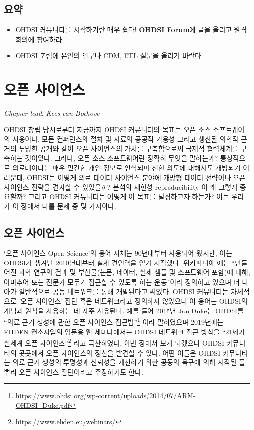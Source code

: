 \documentclass[10.5pt]{book}
\let\rmarkdownfootnote\footnote%
\def\footnote{\protect\rmarkdownfootnote}
\theoremstyle{definition}
\theoremstyle{definition}
\theoremstyle{definition}
\theoremstyle{remark}
\let\BeginKnitrBlock\begin \let\EndKnitrBlock\end
\begin{document}
\section{요약}\label{-1}

\BeginKnitrBlock{rmdsummary}
\begin{itemize}
\item
  OHDSI 커뮤니티를 시작하기란 매우 쉽다! \textbf{OHDSI Forum}에 글을
  올리고 원격 회의에 참여하라.
\item
  OHDSI 포럼에 본인의 연구나 CDM, ETL 질문을 올리기 바란다.
\end{itemize}
\EndKnitrBlock{rmdsummary}

\chapter{오픈 사이언스}\label{OpenScience}


\emph{Chapter lead: Kees van Bochove}

OHDSI 창립 당시로부터 지금까지 OHDSI 커뮤니티의 목표는 오픈 소스
소프트웨어의 사용이나, 모든 컨퍼런스의 절차 및 자료의 공공적 가용성
그리고 생산된 의학적 근거의 투명한 공개와 같이 오픈 사이언스의 가치를
구축함으로써 국제적 협력체계를 구축하는 것이었다. 그러나, 오픈 소스
소프트웨어란 정확히 무엇을 말하는가? 통상적으로 의료데이터는 매우 민간한
개인 정보로 인식되며 선한 의도에 대해서도 개방되기 어려운데, OHDSI는
어떻게 의료 데이터 사이언스 분야에 개방형 데이터 전략이나 오픈 사이언스
전략을 견지할 수 있었을까? 분석의 재현성 reproducibility 이 왜 그렇게
중요할까? 그리고 OHDSI 커뮤니티는 어떻게 이 목표를 달성하고자 하는가?
이는 우리가 이 장에서 다룰 문제 중 몇 가지이다.

\section{오픈 사이언스}\label{-}

`오픈 사이언스 Open Science'의 용어 자체는 90년대부터 사용되어 왔지만,
이는 OHDSI가 생겨난 2010년대부터 실제 견인력을 얻기 시작했다. 위키피디아
\citep{wiki:Open_science} 에는 ``만들어진 과학 연구의 결과 및
부산물(논문, 데이터, 실제 샘플 및 소프트웨어 포함)에 대해, 아마추어 또는
전문가 모두가 접근할 수 있도록 하는 운동''이라 정의하고 있으며 더 나아가
일반적으로 공동 네트워크를 통해 개발된다고 써있다. OHDSI 커뮤니티는
자체적으로 '오픈 사이언스' 집단 혹은 네트워크라고 정의하지 않았으나 이
용어는 OHDSI의 개념과 원칙을 사용하는 데 자주 사용된다. 예를 들어 2015년
Jon Duke는 OHDSI를 ``의료 근거 생성에 관한 오픈 사이언스
접근법''\footnote{\url{https://www.ohdsi.org/wp-content/uploads/2014/07/ARM-OHDSI_Duke.pdf}}
이라 말하였으며 2019년에는 EHDEN 컨소시엄의 입문용 웹 세미나에서는 OHDSI
네트워크 접근 방식을 ``21세기 실세계 오픈 사이언스''\footnote{\url{https://www.ehden.eu/webinars/}}
라고 극찬하였다. 이번 장에서 보게 되겠으나 OHDSI 커뮤니티의 곳곳에서
오픈 사이언스의 정신을 발견할 수 있다. 어떤 이들은 OHDSI 커뮤니티는 의료
근거 생성의 투명성과 신뢰성을 개선하기 위한 공동의 욕구에 의해 시작된
풀뿌리 오픈 사이언스 집단이라고 주장하기도 한다.
\end{document}
